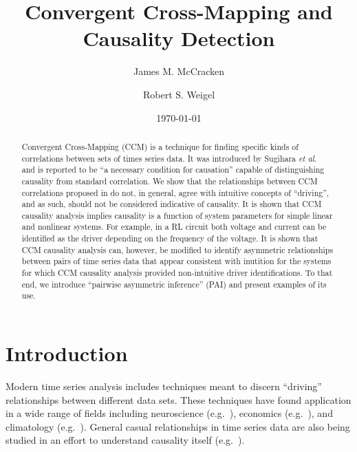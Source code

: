 \documentclass[twocolumn,aps,pre,groupedaddress]{revtex4-1}
\begin{document}
\title{Convergent Cross-Mapping and Causality Detection}
\author{James M. McCracken}
\author{Robert S. Weigel}
\date{\today}

\begin{abstract}
Convergent Cross-Mapping (CCM) is a technique for finding specific kinds of correlations between sets of times series data.  It was introduced by Sugihara {\em et al.\ }\cite{Sugihara2012} and is reported to be ``a necessary condition for causation'' capable of distinguishing causality from standard correlation.  We show that the relationships between CCM correlations proposed in \cite{Sugihara2012} do not, in general, agree with intuitive concepts of ``driving'', and as such, should not be considered indicative of causality.  It is shown that CCM causality analysis implies causality is a function of system parameters for simple linear and nonlinear systems.  For example, in a RL circuit both voltage and current can be identified as the driver depending on the frequency of the voltage.  It is shown that CCM causality analysis can, however, be modified to identify asymmetric relationships between pairs of time series data that appear consistent with inutition for the systems for which CCM causality analysis provided non-intuitive driver identifications.  To that end, we introduce ``pairwise asymmetric inference'' (PAI) and present examples of its use.  
\end{abstract}

\pacs{}
\maketitle

\section{Introduction}
Modern time series analysis includes techniques meant to discern ``driving'' relationships between different data sets.  These techniques have found application in a wide range of fields including neuroscience (e.g.\ \cite{Kaminski2001}), economics (e.g.\ \cite{dufour1998,dufour2006}), and climatology (e.g.\ \cite{mosedale2006}).  General casual relationships in time series data are also being studied in an effort to understand causality itself (e.g.\ \cite{eichler2012}).  
\end{document}
